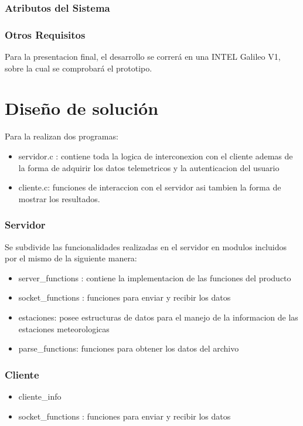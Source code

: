 \documentclass[10pt, a4paper,notitlepage]{article}
\begin{document}
\subsubsection{Atributos del Sistema}
\subsubsection{Otros Requisitos }
Para la presentacion final, el desarrollo se correrá en una INTEL Galileo V1, sobre la cual se comprobará el prototipo.
\section{ Diseño de solución}

Para la realizan dos programas:
\begin{itemize}
	\item servidor.c : contiene toda la logica de interconexion con el cliente ademas de la forma de adquirir los datos telemetricos y la autenticacion del usuario
	\item cliente.c: funciones de interaccion con el servidor asi tambien la forma de mostrar los resultados.
\end{itemize}

\subsubsection{Servidor}
Se subdivide las funcionalidades realizadas en el servidor en modulos incluidos por el mismo de la siguiente manera:
\begin{itemize}
	\item server\_functions : contiene la implementacion de las funciones del producto
	\item socket\_functions : funciones para enviar y recibir los datos
	\item estaciones: posee estructuras de datos para el manejo de la informacion de las estaciones meteorologicas
	\item parse\_functions: funciones para obtener los datos del archivo
\end{itemize}
\subsubsection{Cliente}
\begin{itemize}
	\item cliente\_info
	\item socket\_functions : funciones para enviar y recibir los datos
\end{itemize}
\end{document}
